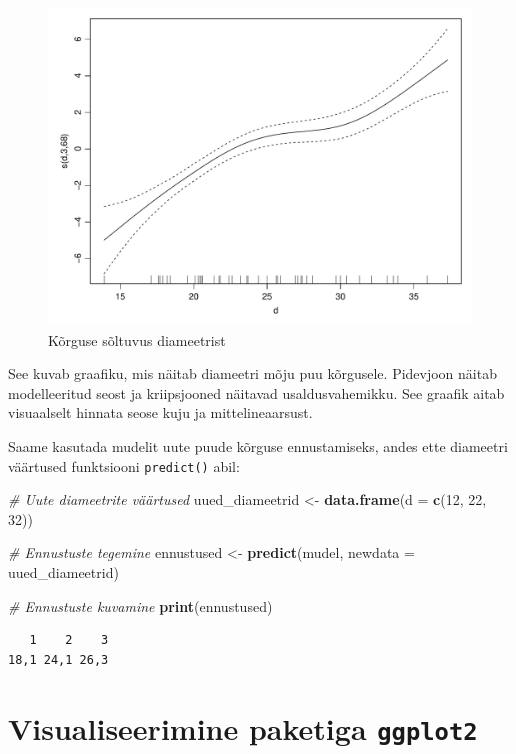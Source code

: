 \documentclass[
]{book}
\newenvironment{Shaded}{\begin{snugshade}}{\end{snugshade}}
\newcommand{\AttributeTok}[1]{\textcolor[rgb]{0.13,0.29,0.53}{#1}}
\newcommand{\CommentTok}[1]{\textcolor[rgb]{0.56,0.35,0.01}{\textit{#1}}}
\newcommand{\DecValTok}[1]{\textcolor[rgb]{0.00,0.00,0.81}{#1}}
\newcommand{\FunctionTok}[1]{\textcolor[rgb]{0.13,0.29,0.53}{\textbf{#1}}}
\newcommand{\NormalTok}[1]{#1}
\newcommand{\OtherTok}[1]{\textcolor[rgb]{0.56,0.35,0.01}{#1}}
\renewenvironment{Shaded} {\begin{snugshade}\footnotesize} {\end{snugshade}}
\begin{document}
\begin{figure}[!ht]
\includegraphics[width=0.8\linewidth]{_main_files/figure-latex/unnamed-chunk-88-1} \caption{Kõrguse sõltuvus diameetrist}\label{fig:unnamed-chunk-88}
\end{figure}

See kuvab graafiku, mis näitab diameetri mõju puu kõrgusele. Pidevjoon näitab modelleeritud seost ja kriipsjooned näitavad usaldusvahemikku. See graafik aitab visuaalselt hinnata seose kuju ja mittelineaarsust.

Saame kasutada mudelit uute puude kõrguse ennustamiseks, andes ette diameetri väärtused funktsiooni \texttt{predict()} abil:

\begin{Shaded}
\begin{Highlighting}[]
\CommentTok{\# Uute diameetrite väärtused}
\NormalTok{uued\_diameetrid }\OtherTok{\textless{}{-}} \FunctionTok{data.frame}\NormalTok{(}\AttributeTok{d =} \FunctionTok{c}\NormalTok{(}\DecValTok{12}\NormalTok{, }\DecValTok{22}\NormalTok{, }\DecValTok{32}\NormalTok{))}

\CommentTok{\# Ennustuste tegemine}
\NormalTok{ennustused }\OtherTok{\textless{}{-}} \FunctionTok{predict}\NormalTok{(mudel, }\AttributeTok{newdata =}\NormalTok{ uued\_diameetrid)}

\CommentTok{\# Ennustuste kuvamine}
\FunctionTok{print}\NormalTok{(ennustused)}
\end{Highlighting}
\end{Shaded}

\begin{verbatim}
   1    2    3 
18,1 24,1 26,3 
\end{verbatim}

\section{\texorpdfstring{Visualiseerimine paketiga \texttt{ggplot2}}{Visualiseerimine paketiga ggplot2}}\label{visualiseerimine-paketiga-ggplot2}
\end{document}
